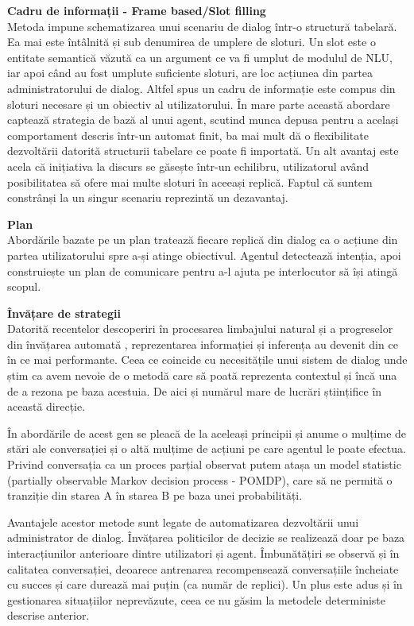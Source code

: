 \textbf{Cadru de informații - Frame based/Slot filling}\\
Metoda impune schematizarea unui scenariu de dialog într-o structură tabelară. Ea mai este întâlnită și sub denumirea de umplere de sloturi. Un slot este o entitate semantică văzută ca un argument ce va fi umplut de modulul de NLU, iar apoi când au fost umplute suficiente sloturi, are loc acțiunea din partea administratorului de dialog. Altfel spus un cadru de informație este compus din sloturi necesare și un obiectiv al utilizatorului. În mare parte această abordare captează strategia de bază al unui agent, scutind munca depusa pentru a același comportament descris într-un automat finit, ba mai mult dă o flexibilitate dezvoltării datorită structurii tabelare ce poate fi importată. Un alt avantaj este acela că inițiativa la discurs se găsește într-un echilibru, utilizatorul având posibilitatea să ofere mai multe sloturi în aceeași replică. Faptul că suntem constrânși la un singur scenariu reprezintă un dezavantaj.

\textbf{Plan}\\
Abordările bazate pe un plan tratează fiecare replică din dialog ca o acțiune din partea utilizatorului spre a-și atinge obiectivul. Agentul detectează intenția, apoi construiește un plan de comunicare pentru a-l ajuta pe interlocutor să își atingă scopul.

\textbf{Învățare de strategii}\\
Datorită recentelor descoperiri în procesarea limbajului natural \cite{metode-de-reprezentare} și a progreselor din învățarea automată \cite{rnn}, reprezentarea informației și inferența au devenit din ce în ce mai performante. Ceea ce coincide cu necesitățile unui sistem de dialog unde știm ca avem nevoie de o metodă care să poată reprezenta contextul și încă una de a rezona pe baza acestuia. De aici și numărul mare de lucrări științifice în această direcție.

În abordările de acest gen se pleacă de la aceleași principii și anume o mulțime de stări ale conversației și o altă mulțime de acțiuni pe care agentul le poate efectua. Privind conversația ca un proces parțial observat putem atașa un model statistic (partially observable Markov decision process - POMDP), care să ne permită o tranziție din starea A în starea B pe baza unei probabilități.

Avantajele acestor metode sunt legate de automatizarea dezvoltării unui administrator de dialog. Învățarea politicilor de decizie se realizează doar pe baza interacțiunilor anterioare dintre utilizatori și agent. Îmbunătățiri se observă și în calitatea conversației, deoarece antrenarea recompensează conversațiile încheiate cu succes și care durează mai puțin (ca număr de replici). Un plus este adus și în gestionarea situațiilor neprevăzute, ceea ce nu găsim la metodele deterministe descrise anterior.

